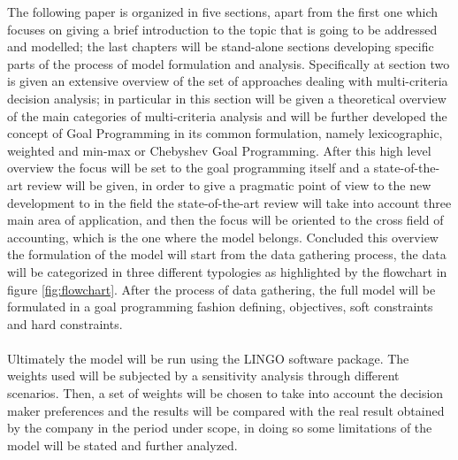 \begin{doublespace}
The following paper is organized in five sections, apart from the first one which focuses on giving a brief introduction to the topic that is going to be addressed and modelled; the last chapters will be stand-alone sections developing specific parts of the process of model formulation and analysis. Specifically at section two is given an extensive overview of the set of approaches dealing with multi-criteria decision analysis; in particular in this section will be given a theoretical overview of the main categories of multi-criteria analysis and will be further developed the concept of Goal Programming in its common formulation, namely lexicographic, weighted and min-max or Chebyshev Goal Programming. After this high level overview the focus will be set to the goal programming itself and a state-of-the-art review will be given, in order to give a pragmatic point of view to the new development to in the field the state-of-the-art review will take into account three main area of application, and then the focus will be oriented to the cross field of accounting, which is the one where the model belongs. Concluded this overview the formulation of the model will start from the data gathering process, the data will be categorized in three different typologies as highlighted by the flowchart in figure \ref{fig:flowchart}. After the process of data gathering, the full model will be formulated in a goal programming fashion defining, objectives, soft constraints and hard constraints.
\\
\\
Ultimately the model will be run using the LINGO software package. The weights used will be subjected by a sensitivity analysis through different scenarios. Then, a set of weights will be chosen to take into account the decision maker preferences and the results will be compared with the real result obtained by the company in the period under scope, in doing so some limitations of the model will be stated and further analyzed.

\pagebreak 

\end{doublespace}
